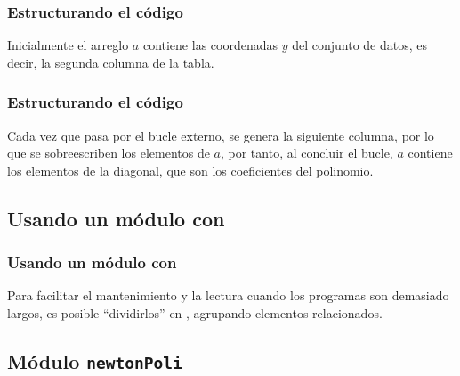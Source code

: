\documentclass[12pt]{beamer}
\begin{document}
\begin{frame}
\frametitle{Estructurando el código}
Inicialmente el arreglo $a$ contiene las coordenadas $y$ del conjunto de datos, es decir, la segunda columna de la tabla.
\end{frame}
\begin{frame}
\frametitle{Estructurando el código}
Cada vez que pasa por el bucle externo, se genera la siguiente columna, por lo que se sobreescriben los elementos de $a$, por tanto, al concluir el bucle, $a$ contiene los elementos de la diagonal, que son los coeficientes del polinomio.
\end{frame}

\subsection*{Usando un módulo con \python}

\begin{frame}
\frametitle{Usando un módulo con \python}
Para facilitar el mantenimiento y la lectura cuando los programas son demasiado largos, es posible \enquote{dividirlos} en , agrupando elementos relacionados.
\end{frame}

\subsection{Módulo \texttt{newtonPoli}}
\end{document}
